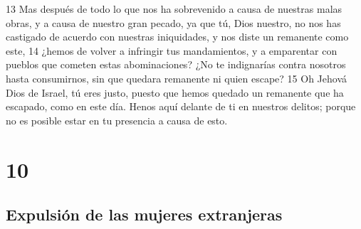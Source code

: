 13 Mas después de todo lo que nos ha sobrevenido a causa de nuestras malas obras, y a causa de nuestro gran pecado, ya que tú, Dios nuestro, no nos has castigado de acuerdo con nuestras iniquidades, y nos diste un remanente como este,
14 ¿hemos de volver a infringir tus mandamientos, y a emparentar con pueblos que cometen estas abominaciones? ¿No te indignarías contra nosotros hasta consumirnos, sin que quedara remanente ni quien escape?
15 Oh Jehová Dios de Israel, tú eres justo, puesto que hemos quedado un remanente que ha escapado, como en este día. Henos aquí delante de ti en nuestros delitos; porque no es posible estar en tu presencia a causa de esto.

\chapter{10}

\section*{Expulsión de las mujeres extranjeras}

